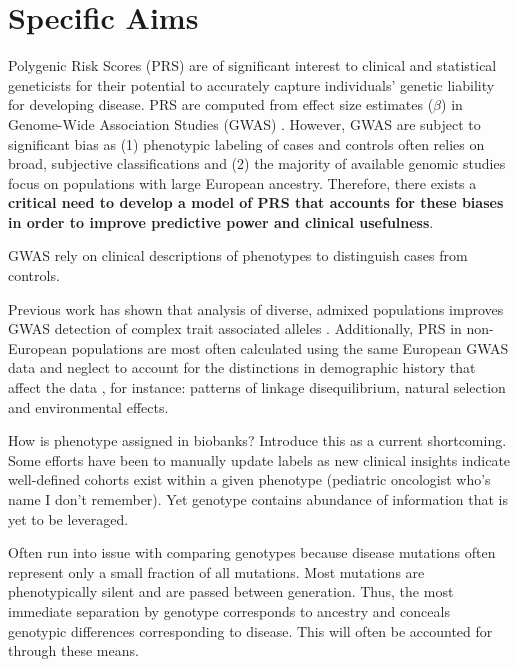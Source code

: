 \documentclass[11pt]{article}  %
\begin{document}
\pagestyle{empty}












\section*{Specific Aims}
Polygenic Risk Scores (PRS) are of significant interest to clinical and statistical geneticists for their potential to accurately capture individuals' genetic liability for developing disease. PRS are computed from effect size estimates ($\beta$) in Genome-Wide Association Studies (GWAS) \cite{choi_tutorial_2020}. However, GWAS are subject to significant bias \cite{dudbridge_power_2013} as (1) phenotypic labeling of cases and controls often relies on broad, subjective classifications and (2) the majority of available genomic studies focus on populations with large European ancestry. Therefore, there exists a \textbf{critical need to develop a model of PRS that accounts for these biases in order to improve predictive power and clinical usefulness}.

GWAS rely on clinical descriptions of phenotypes to distinguish cases from controls. \cite{nicolau_topology_2011}  

Previous work has shown that analysis of diverse, admixed populations improves GWAS detection of complex trait associated alleles \cite{wojcik_genetic_2019}. Additionally, PRS in non-European populations are most often calculated using the same European GWAS data and neglect to account for the distinctions in demographic history that affect the data \cite{x}, for instance: patterns of linkage disequilibrium, natural selection and environmental effects.   

How is phenotype assigned in biobanks? Introduce this as a current shortcoming. Some efforts have been to manually update labels as new clinical insights indicate well-defined cohorts exist within a given phenotype (pediatric oncologist who’s name I don't remember). Yet genotype contains abundance of information that is yet to be leveraged.

Often run into issue with comparing genotypes because disease mutations often represent only a small fraction of all mutations. Most mutations are phenotypically silent and are passed between generation. Thus, the most immediate separation by genotype corresponds to ancestry and conceals genotypic differences corresponding to disease. This will often be accounted for through these means.
\end{document}
